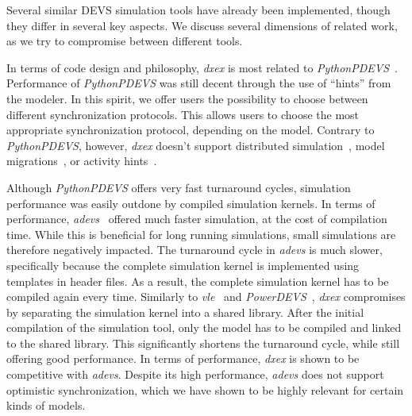 Several similar \textsf{DEVS} simulation tools have already been implemented, though they differ in several key aspects.
We discuss several dimensions of related work, as we try to compromise between different tools.

In terms of code design and philosophy, \textit{dxex} is most related to \textit{PythonPDEVS}~\cite{PythonPDEVS}.
Performance of \textit{PythonPDEVS} was still decent through the use of ``hints'' from the modeler.
In this spirit, we offer users the possibility to choose between different synchronization protocols.
This allows users to choose the most appropriate synchronization protocol, depending on the model.
Contrary to \textit{PythonPDEVS}, however, \textit{dxex} doesn't support distributed simulation~\cite{JDF}, model migrations~\cite{PythonPDEVS2}, or activity hints~\cite{PythonPDEVS_ACTIMS}.

Although \textit{PythonPDEVS} offers very fast turnaround cycles, simulation performance was easily outdone by compiled simulation kernels.
In terms of performance, \textit{adevs}~\cite{adevs} offered much faster simulation, at the cost of compilation time.
While this is beneficial for long running simulations, small simulations are therefore negatively impacted.
The turnaround cycle in \textit{adevs} is much slower, specifically because the complete simulation kernel is implemented using templates in header files.
As a result, the complete simulation kernel has to be compiled again every time.
Similarly to \textit{vle}~\cite{vle} and \textit{PowerDEVS}~\cite{PowerDEVS}, \textit{dxex} compromises by separating the simulation kernel into a shared library.
After the initial compilation of the simulation tool, only the model has to be compiled and linked to the shared library.
This significantly shortens the turnaround cycle, while still offering good performance.
In terms of performance, \textit{dxex} is shown to be competitive with \textit{adevs}.
Despite its high performance, \textit{adevs} does not support optimistic synchronization, which we have shown to be highly relevant for certain kinds of models.

